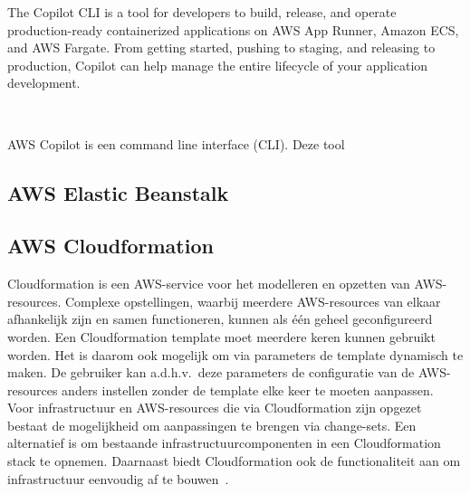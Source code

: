 
The Copilot CLI is a tool for developers to build, release, and operate production-ready containerized applications on AWS App Runner,
Amazon ECS, and AWS Fargate.
From getting started, pushing to staging, and releasing to production, Copilot can help manage the entire lifecycle of your application development.

~\autocite{Karakus2022}

AWS Copilot is een command line interface (CLI).
Deze tool~\autocite{Kumar2022}


\subsection{AWS Elastic Beanstalk}
\label{subsec:service-elastic-beanstalk}

\subsection{AWS Cloudformation}
\label{subsec:service-cloudformation}

Cloudformation is een AWS-service voor het modelleren en opzetten van AWS-resources.
Complexe opstellingen, waarbij meerdere AWS-resources van elkaar afhankelijk zijn en samen functioneren, kunnen als één geheel geconfigureerd worden.
Een Cloudformation template moet meerdere keren kunnen gebruikt worden.
Het is daarom ook mogelijk om via parameters de template dynamisch te maken.
De gebruiker kan a.d.h.v.\ deze parameters de configuratie van de AWS-resources anders instellen zonder de template elke keer te moeten aanpassen.
Voor infrastructuur en AWS-resources die via Cloudformation zijn opgezet bestaat de mogelijkheid om aanpassingen te brengen via change-sets.
Een alternatief is om bestaande infrastructuurcomponenten in een Cloudformation stack te opnemen.
Daarnaast biedt Cloudformation ook de functionaliteit aan om infrastructuur eenvoudig af te bouwen~\autocite{Mansoor2014}.

